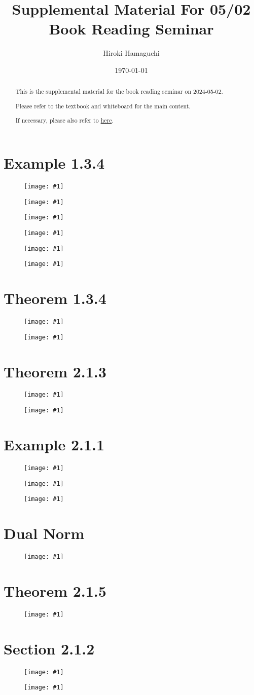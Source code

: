 \documentclass[a4paper, 10pt, dvipdfmx]{article}
\newcommand{\IMG}[2]{
    \begin{figure}[H]
        \centering
        \texttt{[image: \#1]}
        \caption{}
    \end{figure}
}
\begin{document}
\title{Supplemental Material For 05/02 Book Reading Seminar}
\author{Hiroki Hamaguchi}
\date{\today}
\maketitle

\begin{abstract}
    \begin{center}
        This is the supplemental material for the book reading seminar on 2024-05-02.

        Please refer to the textbook and whiteboard for the main content.

        If necessary, please also refer to \href{https://github.com/hari64boli64/BookReadingSeminarOn20240502}{here}.
    \end{center}
\end{abstract}

\section*{Example 1.3.4}
\IMG{example1.3.4_f1.png}{0.6}
\IMG{example1.3.4_quadraticPenalty.png}{0.6}
\IMG{example1.3.4_nonSmoothPenalty.png}{0.6}
\IMG{example1.3.4_powerFunctionBarrier_withP2.png}{0.6}
\IMG{example1.3.4_logarithmicBarrier.png}{0.6}
\IMG{example1.3.4_exponentialBarrier.png}{0.6}

\section*{Theorem 1.3.4}
\IMG{theorem1.3.4_(x-2)^2.png}{0.6}
\IMG{theorem1.3.4_(x-8)^2.png}{0.6}

\section*{Theorem 2.1.3}
\IMG{theorem2.1.3_1d.png}{0.8}
\IMG{theorem2.1.3_2d.png}{0.8}

\section*{Example 2.1.1}
\IMG{example2.1.1_2.png}{0.6}
\IMG{example2.1.1_3.png}{0.6}
\IMG{example2.1.1_3d.png}{0.7}

\section*{Dual Norm}
\IMG{dualNorm.png}{0.8}

\section*{Theorem 2.1.5}
\IMG{theorem2.1.5.png}{0.8}

\section*{Section 2.1.2}
\IMG{section2.1.2_vis.png}{0.9}
\IMG{section2.1.2_main.png}{0.9}
\end{document}
